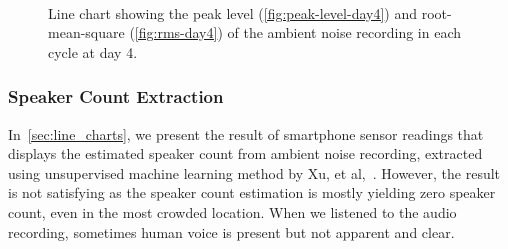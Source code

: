 	\begin{figure}[H]
		\\
		\caption{Line chart showing the peak level (\ref{fig:peak-level-day4}) and root-mean-square (\ref{fig:rms-day4}) of the ambient noise recording in each cycle at day 4.}
	\label{fig:audio-result-day4}
	\end{figure}


	\subsubsection{Speaker Count Extraction} %
	\label{ssub:probe_request_based_estimation}
	In~\autoref{sec:line_charts}, we present the result of smartphone sensor readings that displays the estimated speaker count from ambient noise recording, extracted using unsupervised machine learning method by Xu, et al,~\cite{thesis067}. However, the result is not satisfying as the speaker count estimation is mostly yielding zero speaker count, even in the most crowded location. When we listened to the audio recording, sometimes human voice is present but not apparent and clear.

